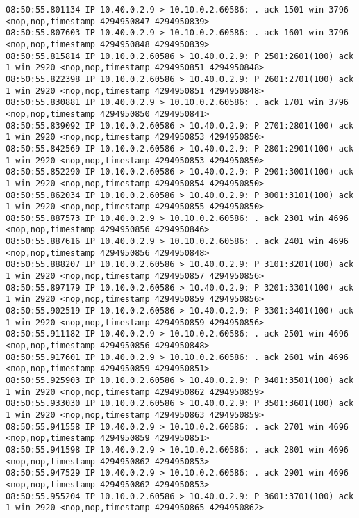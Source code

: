 \documentclass[a4paper,12pt]{article}
\begin{document}
\begin{Verbatim}
08:50:55.801134 IP 10.40.0.2.9 > 10.10.0.2.60586: . ack 1501 win 3796 <nop,nop,timestamp 4294950847 4294950839>
08:50:55.807603 IP 10.40.0.2.9 > 10.10.0.2.60586: . ack 1601 win 3796 <nop,nop,timestamp 4294950848 4294950839>
08:50:55.815814 IP 10.10.0.2.60586 > 10.40.0.2.9: P 2501:2601(100) ack 1 win 2920 <nop,nop,timestamp 4294950851 4294950848>
08:50:55.822398 IP 10.10.0.2.60586 > 10.40.0.2.9: P 2601:2701(100) ack 1 win 2920 <nop,nop,timestamp 4294950851 4294950848>
08:50:55.830881 IP 10.40.0.2.9 > 10.10.0.2.60586: . ack 1701 win 3796 <nop,nop,timestamp 4294950850 4294950841>
08:50:55.839092 IP 10.10.0.2.60586 > 10.40.0.2.9: P 2701:2801(100) ack 1 win 2920 <nop,nop,timestamp 4294950853 4294950850>
08:50:55.842569 IP 10.10.0.2.60586 > 10.40.0.2.9: P 2801:2901(100) ack 1 win 2920 <nop,nop,timestamp 4294950853 4294950850>
08:50:55.852290 IP 10.10.0.2.60586 > 10.40.0.2.9: P 2901:3001(100) ack 1 win 2920 <nop,nop,timestamp 4294950854 4294950850>
08:50:55.862034 IP 10.10.0.2.60586 > 10.40.0.2.9: P 3001:3101(100) ack 1 win 2920 <nop,nop,timestamp 4294950855 4294950850>
08:50:55.887573 IP 10.40.0.2.9 > 10.10.0.2.60586: . ack 2301 win 4696 <nop,nop,timestamp 4294950856 4294950846>
08:50:55.887616 IP 10.40.0.2.9 > 10.10.0.2.60586: . ack 2401 win 4696 <nop,nop,timestamp 4294950856 4294950848>
08:50:55.888207 IP 10.10.0.2.60586 > 10.40.0.2.9: P 3101:3201(100) ack 1 win 2920 <nop,nop,timestamp 4294950857 4294950856>
08:50:55.897179 IP 10.10.0.2.60586 > 10.40.0.2.9: P 3201:3301(100) ack 1 win 2920 <nop,nop,timestamp 4294950859 4294950856>
08:50:55.902519 IP 10.10.0.2.60586 > 10.40.0.2.9: P 3301:3401(100) ack 1 win 2920 <nop,nop,timestamp 4294950859 4294950856>
08:50:55.911182 IP 10.40.0.2.9 > 10.10.0.2.60586: . ack 2501 win 4696 <nop,nop,timestamp 4294950856 4294950848>
08:50:55.917601 IP 10.40.0.2.9 > 10.10.0.2.60586: . ack 2601 win 4696 <nop,nop,timestamp 4294950859 4294950851>
08:50:55.925903 IP 10.10.0.2.60586 > 10.40.0.2.9: P 3401:3501(100) ack 1 win 2920 <nop,nop,timestamp 4294950862 4294950859>
08:50:55.933030 IP 10.10.0.2.60586 > 10.40.0.2.9: P 3501:3601(100) ack 1 win 2920 <nop,nop,timestamp 4294950863 4294950859>
08:50:55.941558 IP 10.40.0.2.9 > 10.10.0.2.60586: . ack 2701 win 4696 <nop,nop,timestamp 4294950859 4294950851>
08:50:55.941598 IP 10.40.0.2.9 > 10.10.0.2.60586: . ack 2801 win 4696 <nop,nop,timestamp 4294950862 4294950853>
08:50:55.947529 IP 10.40.0.2.9 > 10.10.0.2.60586: . ack 2901 win 4696 <nop,nop,timestamp 4294950862 4294950853>
08:50:55.955204 IP 10.10.0.2.60586 > 10.40.0.2.9: P 3601:3701(100) ack 1 win 2920 <nop,nop,timestamp 4294950865 4294950862>

\end{Verbatim}
\end{document}

